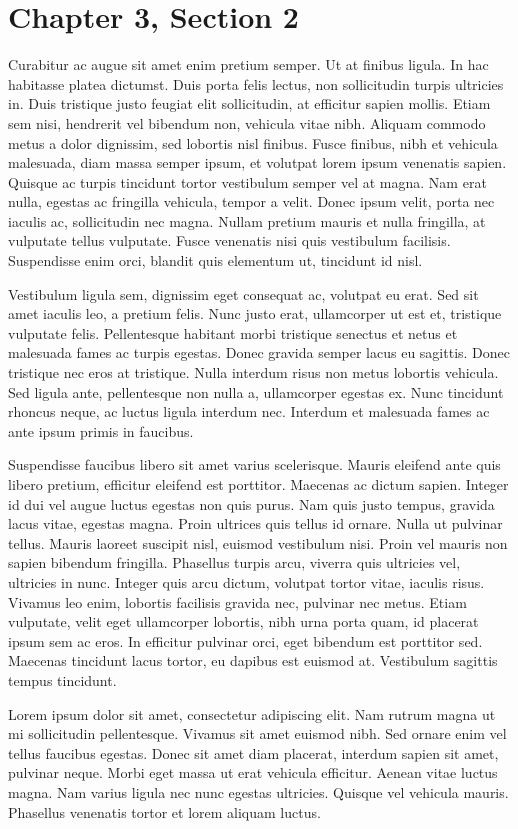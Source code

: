 \section{Chapter 3, Section 2}

Curabitur ac augue sit amet enim pretium semper. Ut at finibus ligula. In hac habitasse platea dictumst. Duis porta felis lectus, non sollicitudin turpis ultricies in. Duis tristique justo feugiat elit sollicitudin, at efficitur sapien mollis. Etiam sem nisi, hendrerit vel bibendum non, vehicula vitae nibh. Aliquam commodo metus a dolor dignissim, sed lobortis nisl finibus. Fusce finibus, nibh et vehicula malesuada, diam massa semper ipsum, et volutpat lorem ipsum venenatis sapien. Quisque ac turpis tincidunt tortor vestibulum semper vel at magna. Nam erat nulla, egestas ac fringilla vehicula, tempor a velit. Donec ipsum velit, porta nec iaculis ac, sollicitudin nec magna. Nullam pretium mauris et nulla fringilla, at vulputate tellus vulputate. Fusce venenatis nisi quis vestibulum facilisis. Suspendisse enim orci, blandit quis elementum ut, tincidunt id nisl.

Vestibulum ligula sem, dignissim eget consequat ac, volutpat eu erat. Sed sit amet iaculis leo, a pretium felis. Nunc justo erat, ullamcorper ut est et, tristique vulputate felis. Pellentesque habitant morbi tristique senectus et netus et malesuada fames ac turpis egestas. Donec gravida semper lacus eu sagittis. Donec tristique nec eros at tristique. Nulla interdum risus non metus lobortis vehicula. Sed ligula ante, pellentesque non nulla a, ullamcorper egestas ex. Nunc tincidunt rhoncus neque, ac luctus ligula interdum nec. Interdum et malesuada fames ac ante ipsum primis in faucibus.

Suspendisse faucibus libero sit amet varius scelerisque. Mauris eleifend ante quis libero pretium, efficitur eleifend est porttitor. Maecenas ac dictum sapien. Integer id dui vel augue luctus egestas non quis purus. Nam quis justo tempus, gravida lacus vitae, egestas magna. Proin ultrices quis tellus id ornare. Nulla ut pulvinar tellus. Mauris laoreet suscipit nisl, euismod vestibulum nisi. Proin vel mauris non sapien bibendum fringilla. Phasellus turpis arcu, viverra quis ultricies vel, ultricies in nunc. Integer quis arcu dictum, volutpat tortor vitae, iaculis risus. Vivamus leo enim, lobortis facilisis gravida nec, pulvinar nec metus. Etiam vulputate, velit eget ullamcorper lobortis, nibh urna porta quam, id placerat ipsum sem ac eros. In efficitur pulvinar orci, eget bibendum est porttitor sed. Maecenas tincidunt lacus tortor, eu dapibus est euismod at. Vestibulum sagittis tempus tincidunt. 

Lorem ipsum dolor sit amet, consectetur adipiscing elit. Nam rutrum magna ut mi sollicitudin pellentesque. Vivamus sit amet euismod nibh. Sed ornare enim vel tellus faucibus egestas. Donec sit amet diam placerat, interdum sapien sit amet, pulvinar neque. Morbi eget massa ut erat vehicula efficitur. Aenean vitae luctus magna. Nam varius ligula nec nunc egestas ultricies. Quisque vel vehicula mauris. Phasellus venenatis tortor et lorem aliquam luctus.